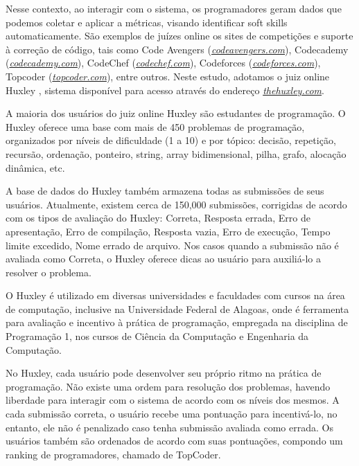 Nesse contexto, ao interagir com o sistema, os programadores geram dados que podemos coletar e aplicar a métricas, visando identificar soft skills automaticamente.
São exemplos de juízes online os sites de competições e suporte à correção de código, tais como 
Code Avengers (\href{codeavengers.com}{\textit{codeavengers.com}}),
Codecademy (\href{codecademy.com}{\textit{codecademy.com}}), 
CodeChef (\href{codechef.com}{\textit{codechef.com}}), 
Codeforces (\href{codeforces.com}{\textit{codeforces.com}}), 
Topcoder (\href{topcoder.com}{\textit{topcoder.com}}),
 entre outros.
Neste estudo, adotamos o juiz online Huxley \cite{paes:13}, sistema disponível para acesso através do endereço 
\href{thehuxley.com}{\textit{thehuxley.com}}.

A maioria dos usuários do juiz online Huxley são estudantes de programação. O Huxley oferece uma base com mais de 450 problemas de programação, organizados por níveis de dificuldade (1 a 10) e por tópico: decisão, repetição, recursão, ordenação, ponteiro, string, array bidimensional, pilha, grafo, alocação dinâmica, etc.

A base de dados do Huxley também armazena todas as submissões de seus usuários. Atualmente, existem cerca de 150,000 submissões, corrigidas de acordo com os tipos de avaliação do Huxley: Correta, Resposta errada, Erro de apresentação, Erro de compilação, Resposta vazia, Erro de execução, Tempo limite excedido, Nome errado de arquivo. 
Nos casos quando a submissão não é avaliada como Correta, o Huxley oferece dicas ao usuário para auxiliá-lo a resolver o problema. 

O Huxley é utilizado em diversas universidades e faculdades com cursos na área de computação, inclusive na Universidade Federal de Alagoas, onde é ferramenta para avaliação e incentivo à prática de programação, empregada na disciplina de Programação 1, nos cursos de Ciência da Computação e Engenharia da Computação.

No Huxley, cada usuário pode desenvolver seu próprio ritmo na prática de programação. Não existe uma ordem para resolução dos problemas, havendo liberdade para interagir com o sistema de acordo com os níveis dos mesmos. A cada submissão correta, o usuário recebe uma pontuação para incentivá-lo, no entanto, ele não é penalizado caso tenha submissão avaliada como errada. Os usuários também são ordenados de acordo com suas pontuações, compondo um ranking de programadores, chamado de TopCoder.

